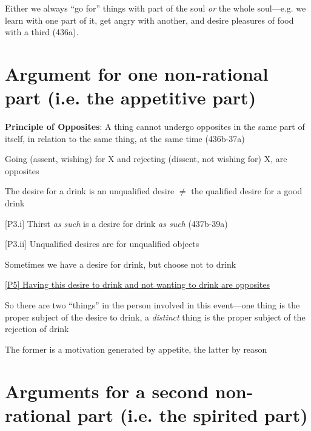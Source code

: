 \documentclass[11pt]{article}
\begin{document}
\noindent Either we always ``go for'' things with part of the soul \emph{or} the whole soul---e.g. we learn with one part of it, get angry with another, and desire pleasures of food with a third (436a).
\vspace*{-3mm}

\section*{Argument for one non-rational part (i.e. the appetitive part)}

\noindent [P1] \textbf{Principle of Opposites}: A thing cannot undergo opposites in the same part of itself, in relation to the same thing, at the same time (436b-37a)
\vspace*{1mm}

\noindent [P2] Going (assent, wishing) for X and rejecting (dissent, not wishing for) X, are opposites
\vspace*{1mm}

\noindent [P3] The desire for a drink is an unqualified desire $\neq$ the qualified desire for a good drink
\vspace*{1mm}

[P3.i] Thirst \emph{as such} is a desire for drink \emph{as such} (437b-39a)
\vspace*{1mm}

[P3.ii] Unqualified desires are for unqualified objects
\vspace*{1mm}

\noindent [P4] Sometimes we have a desire for drink, but choose not to drink
\vspace*{1mm}

\noindent\underline{[P5] Having this desire to drink and not wanting to drink are opposites}
\vspace*{1mm}

\noindent [C] So there are two ``things'' in the person involved in this event---one thing is the proper subject of the desire to drink, a \emph{distinct} thing is the proper subject of the rejection of drink
\vspace*{1mm}

\noindent The former is a motivation generated by appetite, the latter by reason
\vspace*{-3mm}

\section*{Arguments for a second non-rational part (i.e. the spirited part)}
\end{document}
